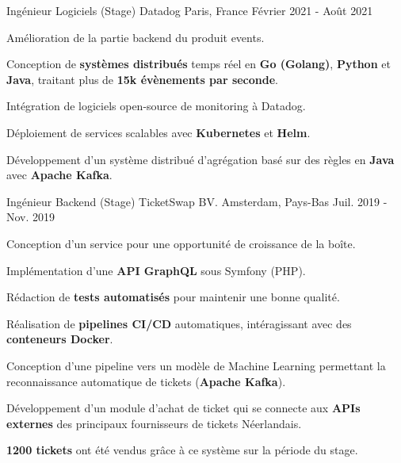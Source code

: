 

\begin{cventries}

  \cventry
    {Ingénieur Logiciels (Stage)} %
    {Datadog} %
    {Paris, France} %
    {Février 2021 - Août 2021} %
    {
      \begin{cvitems} %
        \item {Amélioration de la partie backend du produit events.}
        \item {Conception de \textbf{systèmes distribués} temps réel en \textbf{Go (Golang)}, \textbf{Python} et \textbf{Java}, traitant plus de \textbf{15k évènements par seconde}.}
        \item {Intégration de logiciels open-source de monitoring à Datadog.}
        \item {Déploiement de services scalables avec \textbf{Kubernetes} et \textbf{Helm}.}
        \item {Développement d'un système distribué d'agrégation basé sur des règles en \textbf{Java} avec \textbf{Apache Kafka}.}
      \end{cvitems}
    }

  \cventry
    {Ingénieur Backend (Stage)} %
    {TicketSwap BV.} %
    {Amsterdam, Pays-Bas} %
    {Juil. 2019 - Nov. 2019} %
    {
      \begin{cvitems} %
        \item {Conception d'un service pour une opportunité de croissance de la boîte.}
        \item {Implémentation d'une \textbf{API GraphQL} sous Symfony (PHP).}
        \item {Rédaction de \textbf{tests automatisés} pour maintenir une bonne qualité.}
        \item {Réalisation de \textbf{pipelines CI/CD} automatiques, intéragissant avec des \textbf{conteneurs Docker}.}
        \item {Conception d'une pipeline vers un modèle de Machine Learning permettant la reconnaissance automatique de tickets (\textbf{Apache Kafka}).}
        \item {Développement d'un module d'achat de ticket qui se connecte aux \textbf{APIs externes} des principaux fournisseurs de tickets Néerlandais.}
        \item {\textbf{1200 tickets} ont été vendus grâce à ce système sur la période du stage.}
      \end{cvitems}
    }

\end{cventries}
